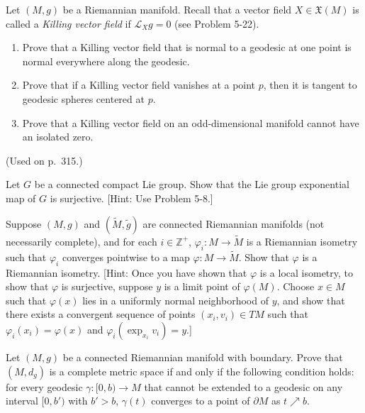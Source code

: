 \begin{exercise}
\label{prob:killing-vector-field-properties}

Let $(M, g)$ be a Riemannian manifold. Recall that a vector field $X \in \mathfrak{X}(M)$ is called a \emph{Killing vector field} if $\mathcal{L}_X g = 0$ (see Problem 5-22).
\begin{enumerate}
\item[(a)] Prove that a Killing vector field that is normal to a geodesic at one point is normal everywhere along the geodesic.
\item[(b)] Prove that if a Killing vector field vanishes at a point $p$, then it is tangent to geodesic spheres centered at $p$.
\item[(c)] Prove that a Killing vector field on an odd-dimensional manifold cannot have an isolated zero.
\end{enumerate}
(Used on p.\ 315.)
\end{exercise}

\begin{exercise}
\label{prob:lie-group-exp-surjective}

Let $G$ be a connected compact Lie group. Show that the Lie group exponential map of $G$ is surjective. [Hint: Use Problem 5-8.]
\end{exercise}

\begin{exercise}
\label{prob:limit-isometry}

Suppose $(M, g)$ and $(\tilde{M}, \tilde{g})$ are connected Riemannian manifolds (not necessarily complete), and for each $i \in \mathbb{Z}^+$, $\varphi_i : M \to \tilde{M}$ is a Riemannian isometry such that $\varphi_i$ converges pointwise to a map $\varphi : M \to \tilde{M}$. Show that $\varphi$ is a Riemannian isometry. [Hint: Once you have shown that $\varphi$ is a local isometry, to show that $\varphi$ is surjective, suppose $y$ is a limit point of $\varphi(M)$. Choose $x \in M$ such that $\varphi(x)$ lies in a uniformly normal neighborhood of $y$, and show that there exists a convergent sequence of points $(x_i, v_i) \in TM$ such that $\varphi_i(x_i) = \varphi(x)$ and $\varphi_i(\exp_{x_i} v_i) = y$.]
\end{exercise}

\begin{exercise}
\label{prob:manifold-boundary-complete}

Let $(M,g)$ be a connected Riemannian manifold with boundary. Prove that $(M, d_g)$ is a complete metric space if and only if the following condition holds: for every geodesic $\gamma: [0,b) \to M$ that cannot be extended to a geodesic on any interval $[0,b')$ with $b' > b$, $\gamma(t)$ converges to a point of $\partial M$ as $t \nearrow b$.
\end{exercise}

